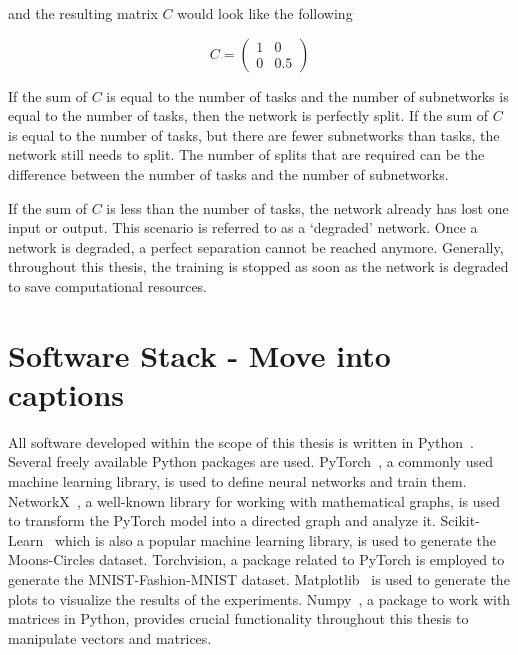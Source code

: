 and the resulting matrix $C$ would look like the following

\[
C = \begin{pmatrix}
    1 & 0 \\ 0 & 0.5
\end{pmatrix}
\]

If the sum of $C$ is equal to the number of tasks and the number of subnetworks is equal to the number of tasks, then the network is perfectly split.
If the sum of $C$ is equal to the number of tasks, but there are fewer subnetworks than tasks, the network still needs to split.
The number of splits that are required can be the difference between the number of tasks and the number of subnetworks.

If the sum of $C$ is less than the number of tasks, the network already has lost one input or output.
This scenario is referred to as a `degraded' network.
Once a network is degraded, a perfect separation cannot be reached anymore.
Generally, throughout this thesis, the training is stopped as soon as the network is degraded to save computational resources.



\section{Software Stack - Move into captions}
All software developed within the scope of this thesis is written in Python~\autocite{python}.
Several freely available Python packages are used.
PyTorch~\autocite{pytorch}, a commonly used machine learning library, is used to define neural networks and train them.
NetworkX~\autocite{networkx}, a well-known library for working with mathematical graphs, is used to transform the PyTorch model into a directed graph and analyze it.
Scikit-Learn~\autocite{sklearn} which is also a popular machine learning library, is used to generate the Moons-Circles dataset.
Torchvision, a package related to PyTorch is employed to generate the MNIST-Fashion-MNIST dataset.
Matplotlib~\autocite{matplotlib} is used to generate the plots to visualize the results of the experiments.
Numpy~\autocite{numpy}, a package to work with matrices in Python, provides crucial functionality throughout this thesis to manipulate vectors and matrices.